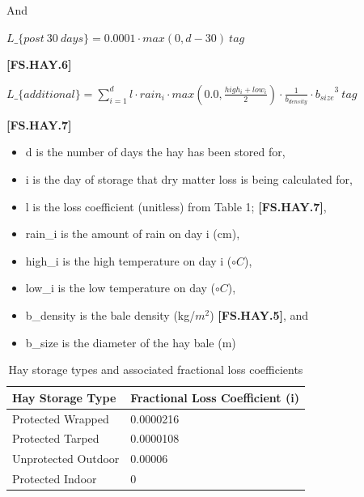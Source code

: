 \begin{refsection}
And
\vspace{0.5cm}

    \begin{center}
        \(L\_\{post\ 30\ days\} =  0.0001 \cdot max(0, d - 30)\ tag\)
    \end{center}
        \vspace{0.5cm}
    
            {\raggedleft \textbf{[FS.HAY.6]}\par}
            \vspace{0.5cm}

        \begin{center}
        \(L\_\{additional\} =  \sum_{i=1}^{d} l \cdot rain_i \cdot max(0.0, \frac{high_i + low_i}{2}) \cdot \frac{1}{b_{density}} \cdot {b_{size}}^3\ tag\)
    \end{center}
        \vspace{0.5cm}
    
            {\raggedleft \textbf{[FS.HAY.7]}\par}
            \vspace{0.5cm}

        \begin{itemize}
            \item d is the number of days the hay has been stored for, 
            \item i is the day of storage that dry matter loss is being calculated for, 
            \item l is the loss coefficient (unitless) from Table 1; \textbf{[FS.HAY.7]}, 
            \item{rain\_i} is the amount of rain on day i (cm), 
            \item{high\_i} is the high temperature on day i (\(\circ C\)), 
            \item{low\_i} is the low temperature on day (\(\circ C\)), 
            \item{b\_density} is the bale density (kg/\(m^2\)) \textbf{[FS.HAY.5]}, and 
            \item{b\_size} is the diameter of the hay bale (m)

        \end{itemize}
\vspace{0.5cm}

\begin{table}[h!]
\centering
\renewcommand{\arraystretch}{1.3}
\caption{Hay storage types and associated fractional loss coefficients}

\begin{tabular}{@{} C{5cm} C{4cm}  @{}}
\toprule
\textbf{Hay Storage Type} & \textbf{Fractional Loss Coefficient (i)}  \\
\midrule
Protected Wrapped & 0.0000216 \\ 
Protected Tarped & 0.0000108 \\
Unprotected Outdoor  & 0.00006 \\
Protected Indoor  & 0 \\
\bottomrule
\end{tabular}
\end{table}


\end{refsection}
